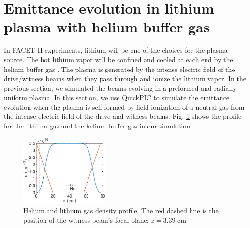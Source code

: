 \documentclass[%
reprint, superscriptaddress,
 amsmath,amssymb, aps,
prstab,
]{revtex4-2}
\begin{document}
\section{Emittance evolution in lithium plasma with helium buffer gas}
In FACET II experiments, lithium
 will be one of the choices for the plasma
source. The hot lithium vapor will be
confined and cooled at each end by the helium buffer gas \cite{PWFA2007,PWFA2014}.
 The plasma is generated by the intense electric field of the drive/witness beams
when they pass through and ionize the lithium vapor. In the previous
section, we simulated the beams evolving in a preformed and radially uniform plasma. In this
section, we use QuickPIC to simulate the emittance evolution when the plasma is self-formed by field ionization of a  neutral
gas from the intense electric field of the drive and witness beams. Fig.
\ref{fig:he_buffer_profile} shows the profile for the lithium gas and
the helium buffer gas in our simulation. \begin{figure}[htbp] \centering
\includegraphics[width=0.4\textwidth]{Helium_buffer_profile.eps}
\caption{Helium and lithium gas density profile. The red dashed line is
the position of the witness beam's focal plane: $z=3.39$ cm}
\label{fig:he_buffer_profile} \end{figure}
\end{document}
